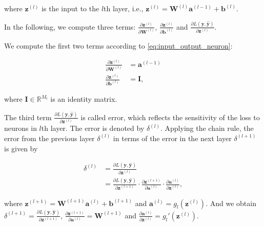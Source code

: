 \documentclass[
	parskip, 			   %
	twoside, 			   %
	DIV=14, 			   %
	BCOR=15.0mm, 		   %
	headsepline, 		   %
	open=right, 		   %
	captions=tableheading, %
	bibliography=totoc,    %
	numbers=noenddot       %
]{scrreprt}
\begin{document}
where $\mathbf{z}^{(l)}$ is the input to the $l$th layer, i.e., $\mathbf{z}^{(l)} = \mathbf{W}^{(l)} \mathbf{a}^{(l-1)} + \mathbf{b}^{(l)}$. 

In the following, we compute three terms: $\frac{\partial \mathbf{z}^{(l)}}{\partial \mathbf{W}^{(l)}}$, $\frac{\partial \mathbf{z}^{(l)}}{\partial \mathbf{b}^{(l)}}$ and $\frac{\partial L \left( \mathbf{y}, \hat{\mathbf{y}} \right)}{\partial \mathbf{z}^{(l)}}$.

We compute the first two terms according to \ref{eq:input_output_neuron}:

\begin{equation}
    \label{eq:two_terms}
    \begin{aligned}
        \frac{\partial \mathbf{z}^{(l)}}{\partial \mathbf{W}^{(l)}} &= \mathbf{a}^{(l-1)}
        \\
        \frac{\partial \mathbf{z}^{(l)}}{\partial \mathbf{b}^{(l)}} &= \mathbf{I},
    \end{aligned}
\end{equation}

where $\mathbf{I} \in \mathbb{R}^{M_{l}}$ is an identity matrix. 

The third term $\frac{\partial L \left( \mathbf{y}, \hat{\mathbf{y}} \right)}{\partial \mathbf{z}^{(l)}}$ is called error, which reflects the sensitivity of the loss to neurons in $l$th layer. The error is denoted by $\delta^{(l)}$. Applying the chain rule, the error from the previous layer $\delta^{(l)}$ in terms of the error in the next layer $\delta^{(l+1)}$ is given by

\begin{equation}
    \label{eq:error_in_one_layer}
    \begin{aligned}
        \delta^{(l)} &= \frac{\partial L \left( \mathbf{y}, \hat{\mathbf{y}} \right)}{\partial \mathbf{z}^{(l)}}
        \\
        &= \frac{\partial L \left( \mathbf{y}, \hat{\mathbf{y}} \right)}{\partial \mathbf{z}^{(l+1)}} \cdot \frac{\partial \mathbf{z}^{(l+1)}}{\partial \mathbf{a}^{(l)}} \cdot \frac{\partial \mathbf{a}^{(l)}}{\partial \mathbf{z}^{(l)}},
    \end{aligned}
\end{equation}

where $\mathbf{z}^{(l+1)} = \mathbf{W}^{(l+1)} \mathbf{a}^{(l)} + \mathbf{b}^{(l+1)}$ and $\mathbf{a}^{(l)} = g_{l}(\mathbf{z}^{(l)})$. And we obtain $\delta^{(l+1)}=\frac{\partial L \left( \mathbf{y}, \hat{\mathbf{y}} \right)}{\partial \mathbf{z}^{(l+1)}}$, $\frac{\partial \mathbf{z}^{(l+1)}}{\partial \mathbf{a}^{(l)}} = \mathbf{W}^{(l+1)}$ and $\frac{\partial \mathbf{a}^{(l)}}{\partial \mathbf{z}^{(l)}} = g_{l}'(\mathbf{z}^{(l)})$.
\end{document}
